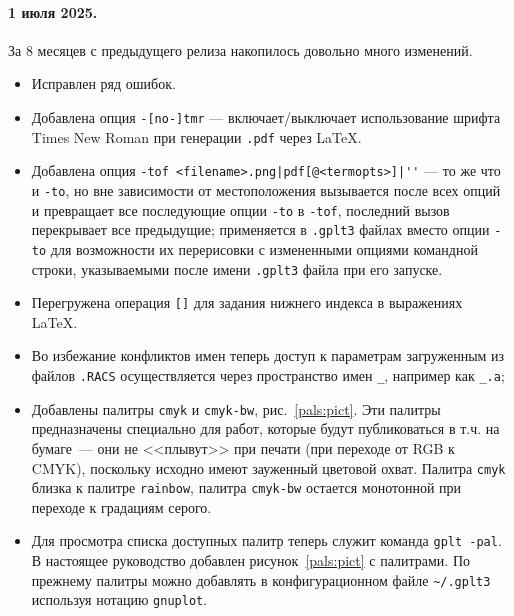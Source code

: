 \documentclass[12pt]{article}
\begin{document}
\paragraph{1 июля 2025.} За 8 месяцев с предыдущего релиза накопилось довольно много изменений.
\begin{itemize}
\item Исправлен ряд ошибок.
\item Добавлена опция \verb'-[no-]tmr' --- включает/выключает использование шрифта Times New Roman при генерации \verb'.pdf' через \LaTeX.
\item Добавлена опция \verb:-tof <filename>.png|pdf[@<termopts>]|'': --- то же что и \verb'-to', но вне зависимости 
  от местоположения вызывается после всех опций и превращает все последующие
   опции \verb'-to' в \verb'-tof', последний вызов перекрывает все предыдущие; применяется в
   \verb'.gplt3' файлах вместо опции \verb'-to' для возможности их перерисовки с измененными опциями командной строки, указываемыми после имени
   \verb'.gplt3' файла при его запуске.
\item Перегружена операция \verb'[]' для задания нижнего индекса в выражениях \LaTeX.
\item Во избежание конфликтов имен теперь доступ к  параметрам загруженным из файлов \verb'.RACS' осуществляется через пространство имен \verb'_',
  например как \verb'_.a';
\item Добавлены палитры \verb'cmyk' и \verb'cmyk-bw', рис.~\ref{pals:pict}. Эти палитры предназначены специально для работ, которые будут публиковаться в т.ч.
  на бумаге~--- они не <<плывут>> при печати (при переходе от RGB к CMYK),
  поскольку исходно имеют зауженный цветовой охват. Палитра \verb'cmyk'  близка к палитре \verb'rainbow', палитра \verb'cmyk-bw'
  остается монотонной при переходе к градациям серого.
\item Для просмотра списка доступных палитр теперь служит команда \verb'gplt -pal'. В настоящее руководство добавлен рисунок~\ref{pals:pict} с
  палитрами. По прежнему палитры можно добавлять в конфигурационном файле \verb'~/.gplt3' используя нотацию \verb'gnuplot'.
\end{itemize}
\end{document}
